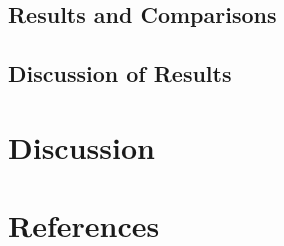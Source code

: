 \documentclass[conference]{IEEEtran}
\begin{document}
\subsection{Results and Comparisons}
\subsection{Discussion of Results}



\section{Discussion}
\label{sec:discussion}

\section*{References}

\nocite{alDhuraibi2017elasticDocker}

% 



\end{document}
